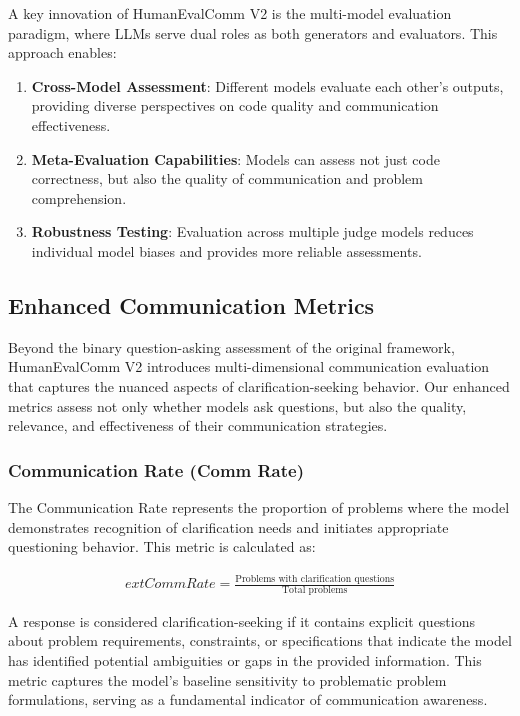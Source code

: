 \documentclass[conference]{IEEEtran}
\begin{document}
A key innovation of HumanEvalComm V2 is the multi-model evaluation paradigm, where LLMs serve dual roles as both generators and evaluators. This approach enables:

\begin{enumerate}
    \item \textbf{Cross-Model Assessment}: Different models evaluate each other's outputs, providing diverse perspectives on code quality and communication effectiveness.
    \item \textbf{Meta-Evaluation Capabilities}: Models can assess not just code correctness, but also the quality of communication and problem comprehension.
    \item \textbf{Robustness Testing}: Evaluation across multiple judge models reduces individual model biases and provides more reliable assessments.
\end{enumerate}

\subsection{Enhanced Communication Metrics}

Beyond the binary question-asking assessment of the original framework, HumanEvalComm V2 introduces multi-dimensional communication evaluation that captures the nuanced aspects of clarification-seeking behavior. Our enhanced metrics assess not only whether models ask questions, but also the quality, relevance, and effectiveness of their communication strategies.

\subsubsection{Communication Rate (Comm Rate)}

The Communication Rate represents the proportion of problems where the model demonstrates recognition of clarification needs and initiates appropriate questioning behavior. This metric is calculated as:

\begin{align}
        ext{Comm Rate} = \frac{\text{Problems with clarification questions}}{\text{Total problems}}
\end{align}

A response is considered clarification-seeking if it contains explicit questions about problem requirements, constraints, or specifications that indicate the model has identified potential ambiguities or gaps in the provided information. This metric captures the model's baseline sensitivity to problematic problem formulations, serving as a fundamental indicator of communication awareness.
\end{document}

